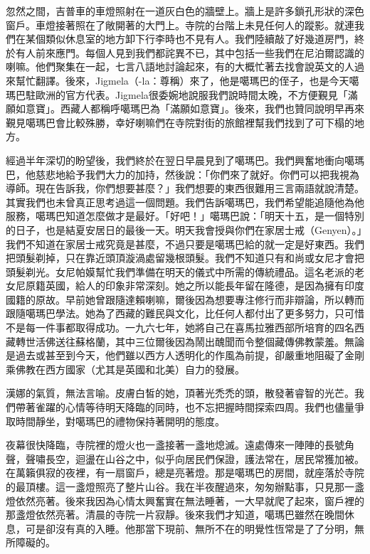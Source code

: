 忽然之間，吉普車的車燈照射在一道灰白色的牆壁上。牆上是許多鎖孔形狀的深色窗戶。車燈接著照在了敞開著的大門上。寺院的台階上未見任何人的蹤影。就連我們在某個類似休息室的地方卸下行李時也不見有人。我們陸續敲了好幾道房門，終於有人前來應門。每個人見到我們都詫異不已，其中包括一些我們在尼泊爾認識的喇嘛。他們聚集在一起，七言八語地討論起來，有的大概忙著去找會說英文的人過來幫忙翻譯。後來，Jigmela（-la：尊稱）來了，他是噶瑪巴的侄子，也是今天噶瑪巴駐歐洲的官方代表。Jigmela很委婉地說服我們說時間太晚，不方便覲見「滿願如意寶」。西藏人都稱呼噶瑪巴為「滿願如意寶」。後來，我們也贊同說明早再來覲見噶瑪巴會比較殊勝，幸好喇嘛們在寺院對街的旅館裡幫我們找到了可下榻的地方。

經過半年深切的盼望後，我們終於在翌日早晨見到了噶瑪巴。我們興奮地衝向噶瑪巴，他慈悲地給予我們大力的加持，然後說：「你們來了就好。你們可以把我視為導師。現在告訴我，你們想要甚麼？」我們想要的東西很難用三言兩語就說清楚。其實我們也未曾真正思考過這一個問題。我們告訴噶瑪巴，我們希望能追隨他為他服務，噶瑪巴知道怎麼做才是最好。「好吧！」噶瑪巴說：「明天十五，是一個特別的日子，也是結夏安居日的最後一天。明天我會授與你們在家居士戒（Genyen）。」我們不知道在家居士戒究竟是甚麼，不過只要是噶瑪巴給的就一定是好東西。我們把頭髮剃掉，只在靠近頭頂漩渦處留幾根頭髮。我們不知道只有和尚或女尼才會把頭髮剃光。女尼帕嫫幫忙我們準備在明天的儀式中所需的傳統禮品。這名老派的老女尼原籍英國，給人的印象非常深刻。她之所以能長年留在隆德，是因為擁有印度國籍的原故。早前她曾跟隨達賴喇嘛，爾後因為想要專注修行而非辯論，所以轉而跟隨噶瑪巴學法。她為了西藏的難民與文化，比任何人都付出了更多努力，只可惜不是每一件事都取得成功。一九六七年，她將自己在喜馬拉雅西部所培育的四名西藏轉世活佛送往蘇格蘭，其中三位爾後因為鬧出醜聞而令整個藏傳佛教蒙羞。無論是過去或甚至到今天，他們雖以西方人透明化的作風為前提，卻嚴重地阻礙了金剛乘佛教在西方國家（尤其是英國和北美）自力的發展。

漢娜的氣質，無法言喻。皮膚白皙的她，頂著光禿禿的頭，散發著睿智的光芒。我們帶著雀躍的心情等待明天降臨的同時，也不忘把握時間探索四周。我們也儘量爭取時間靜坐，對噶瑪巴的禮物保持著開明的態度。

夜幕很快降臨，寺院裡的燈火也一盞接著一盞地熄滅。遠處傳來一陣陣的長號角聲，聲嘯長空，迴盪在山谷之中，似乎向居民們保證，護法常在，居民常獲加被。在萬籟俱寂的夜裡，有一扇窗戶，總是亮著燈。那是噶瑪巴的房間，就座落於寺院的最頂樓。這一盞燈照亮了整片山谷。我在半夜醒過來，匆匆辦點事，只見那一盞燈依然亮著。後來我因為心情太興奮實在無法睡著，一大早就爬了起來，窗戶裡的那盞燈依然亮著。清晨的寺院一片寂靜。後來我們才知道，噶瑪巴雖然在晚間休息，可是卻沒有真的入睡。他那當下現前、無所不在的明覺性恆常是了了分明，無所障礙的。

